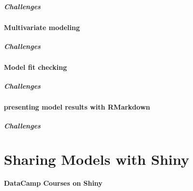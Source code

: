\documentclass[]{book}
\let\oldparagraph\paragraph
\renewcommand{\paragraph}[1]{\oldparagraph{#1}\mbox{}}
\theoremstyle{definition}
\theoremstyle{definition}
\theoremstyle{definition}
\theoremstyle{remark}
\begin{document}
\hypertarget{challenges-7}{%
\paragraph{Challenges}\label{challenges-7}}

\hypertarget{multivariate-modeling}{%
\subsubsection{Multivariate modeling}\label{multivariate-modeling}}

\hypertarget{challenges-8}{%
\paragraph{Challenges}\label{challenges-8}}

\hypertarget{model-fit-checking}{%
\subsubsection{Model fit checking}\label{model-fit-checking}}

\hypertarget{challenges-9}{%
\paragraph{Challenges}\label{challenges-9}}

\hypertarget{presenting-model-results-with-rmarkdown}{%
\subsubsection{presenting model results with
RMarkdown}\label{presenting-model-results-with-rmarkdown}}

\hypertarget{challenges-10}{%
\paragraph{Challenges}\label{challenges-10}}

\hypertarget{sharing-models-with-shiny}{%
\chapter{Sharing Models with Shiny}\label{sharing-models-with-shiny}}

\hypertarget{datacamp-courses-on-shiny}{%
\subsubsection{DataCamp Courses on
Shiny}\label{datacamp-courses-on-shiny}}
\end{document}

